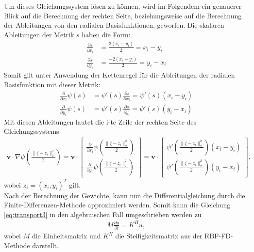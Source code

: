 \documentclass[12pt,titlepage]{article}
\begin{document}
Um dieses Gleichungssystem lösen zu können, wird im Folgendem ein genauerer Blick auf die Berechnung der rechten Seite, beziehungsweise auf die Berechnung der Ableitungen von den radialen Basisfunktionen, geworfen. 
Die skalaren Ableitungen der Metrik $s$ haben die Form:
\begin{align}
 \frac{\partial s}{\partial x_i}&=\frac{2(x_i-y_i)}{2}=x_i-y_i\nonumber\\
 \frac{\partial s}{\partial y_i}&=\frac{-2(x_i-y_i)}{2}=y_i-x_i\nonumber
\end{align}
Somit gilt unter Anwendung der Kettenregel für die Ableitungen der radialen Basisfunktion mit dieser Metrik:
\begin{align}
  \frac{\partial}{\partial x_i}\psi(s)&= \psi'(s)\frac{\partial s}{\partial x_i}=\psi'(s)(x_i-y_i)\nonumber\\
 \frac{\partial}{\partial y_i}\psi(s)&= \psi'(s)\frac{\partial s}{\partial y_i}=\psi'(s)(y_i-x_i)\nonumber
\end{align}
Mit diesen Ableitungen lautet die i-te Zeile der rechten Seite des Gleichungssystems
\begin{align}
\textbf{v}\cdot\nabla\psi\left(\frac{\|\zeta-z_i\|_2^2}{2}\right)
 =
\textbf{v}\cdot
\begin{bmatrix}
\frac{\partial}{\partial x_i}\psi\left(\frac{\|\zeta-z_i\|_2^2}{2}\right)\\
\frac{\partial}{\partial y_i}\psi\left(\frac{\|\zeta-z_i\|_2^2}{2}\right) 
\end{bmatrix}
=
\textbf{v}\cdot
\begin{bmatrix}
\psi'\left(\frac{\|\zeta-z_i\|_2^2}{2}\right)(x_i-y_i) \\
\psi'\left(\frac{\|\zeta-z_i\|_2^2}{2}\right)(y_i-x_i)
\end{bmatrix},\nonumber
\end{align}
wobei $z_i=(x_i,y_i)^T$ gilt.\\
Nach der Berechnung der Gewichte, kann nun die Differentialgleichung durch die Finite-Differenzen-Methode approximiert werden. Somit kann die Gleichung \eqref{eq:transport3} in den algebraischen Fall umgeschrieben werden zu
\begin{align}
 M\frac{\partial u}{\partial t}=K^Hu\label{eq:algTrans},
\end{align}
wobei $M$ die Einheitsmatrix und $K^H$ die Steifigkeitsmatrix aus der RBF-FD-Methode darstellt.
\pagebreak
\end{document}
